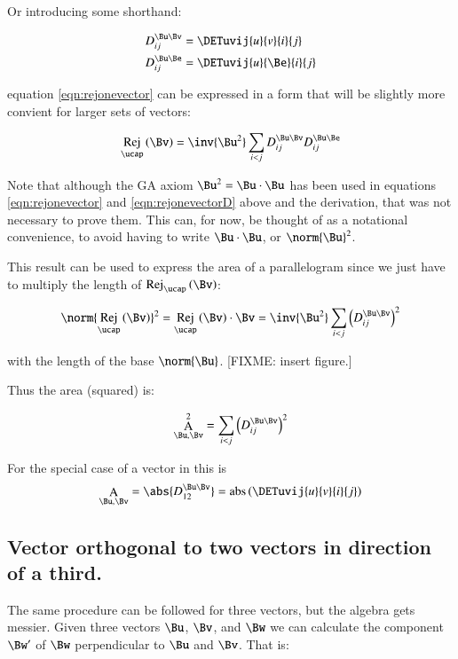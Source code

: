 \documentclass{article}      %
\DeclareMathOperator{\AbsName}{abs}
\DeclareMathOperator{\RejName}{Rej}
\newcommand{\Rej}[2]{\RejName_{#1}\left( {#2} \right)}
\DeclareMathOperator{\AName}{A}
\newcommand{\AreaOp}[1]{\AName_{#1}}
\begin{document}
Or introducing some shorthand:

\begin{align*}
D_{ij}^{\Bu \Bv} &= \DETuvij{u}{v}{i}{j} \\
D_{ij}^{\Bu \Be} &= \DETuvij{u}{\Be}{i}{j} \\
\end{align*}

equation \ref{eqn:rejonevector} can be expressed in a form that will be slightly more convient for larger sets of
vectors:

\begin{equation}\label{eqn:rejonevectorD}
\Rej{\ucap}{\Bv} = \inv{\Bu^2}\sum_{i<j} D_{ij}^{\Bu \Bv} D_{ij}^{\Bu \Be}
\end{equation}

Note that although the GA axiom $\Bu^2 = \Bu \cdot \Bu$ has been used
in equations \ref{eqn:rejonevector} and \ref{eqn:rejonevectorD} above and the derivation, that was
not necessary to prove them.
This can, for now, be thought of as a notational convenience, to avoid having to write $\Bu \cdot \Bu$, or
$\norm{\Bu}^2$.

This result can be used to express the  area of a parallelogram since we just have to multiply the length
of $\Rej{\ucap}{\Bv}$:

\[
\norm{\Rej{\ucap}{\Bv}}^2 = 
\Rej{\ucap}{\Bv} \cdot \Bv =
\inv{\Bu^2}\sum_{i<j} {\left(D_{ij}^{\Bu \Bv}\right)}^2
\]

with the length of the base $\norm{\Bu}$. [FIXME: insert figure.]

Thus the area (squared) is:

\begin{equation}\label{eqn:parallogramarea}
\AreaOp{\Bu,\Bv}^2 = \sum_{i<j} {\left(D_{ij}^{\Bu \Bv}\right)}^2
\end{equation}

For the special case of a vector in  this is
\begin{equation}\label{eqn:parallogramarear2}
\AreaOp{\Bu,\Bv} = \abs{D_{12}^{\Bu \Bv}} = \AbsName\left(\DETuvij{u}{v}{i}{j}\right)
\end{equation}

\subsection{ Vector orthogonal to two vectors in direction of a third. }

The same procedure can be followed for three vectors, but the algebra gets messier.  Given three vectors $\Bu$, $\Bv$, and $\Bw$
we can calculate the component $\Bw'$ of $\Bw$ perpendicular to $\Bu$ and $\Bv$.  That is:
\end{document}
